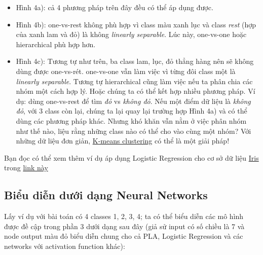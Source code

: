 \begin{itemize}
    \item Hình 4a): cả 4 phương pháp trên đây đều có thể áp dụng được. 

    \item Hình 4b): one-vs-rest không phù hợp vì class màu xanh lục và class \textit{rest} (hợp của xanh lam và đỏ) là không \textit{linearly separable}. Lúc này, one-vs-one hoặc hierarchical phù hợp hơn.  

    \item Hình 4c): Tương tự như trên, ba class lam, lục, đỏ thẳng hàng nên sẽ không dùng được one-vs-rét. one-vs-one vẫn làm việc vì từng đôi class một là \textit{linearly separable}. Tương tự hierarchical cũng làm việc nếu ta phân chia các nhóm một cách hợp lý. Hoặc chúng ta có thể kết hợp nhiều phương pháp. Ví dụ: dùng one-vs-rest để tìm \textit{đỏ} vs \textit{không đỏ}. Nếu một điểm dữ liệu là \textit{không đỏ}, với 3 class còn lại, chúng ta lại quay lại trường hợp Hình 4a) và có thể dùng các phương pháp khác. Nhưng khó khăn vẫn nằm ở việc phân nhóm như thế nào, liệu rằng những class nào có thể cho vào cùng một nhóm? Với những dữ liệu đơn giản, \href{http://machinelearningcoban.com/2017/01/01/kmeans/}{K-means clustering} có thể là một giải pháp! 
\end{itemize}
 
Bạn đọc có thể xem thêm ví dụ áp dụng Logistic Regression cho cơ sở dữ liệu \href{http://machinelearningcoban.com/2017/01/08/knn/#bo-co-so-du-lieu-iris-iris-flower-dataset}{Iris} trong \href{http://scikit-learn.org/stable/auto_examples/linear_model/plot_iris_logistic.html}{link này} 
 
 
 
 
 
 
\subsection{Biểu diễn dưới dạng Neural Networks}
Lấy ví dụ với bài toán có 4 classes 1, 2, 3, 4; ta có thể biểu diễn các mô hình được đề cập trong phần 3 dưới dạng sau đây (giả sử input có số chiều là 7 và node output màu đỏ biểu diễn chung cho cả PLA, Logistic Regression và các networks với activation function khác):  
 
